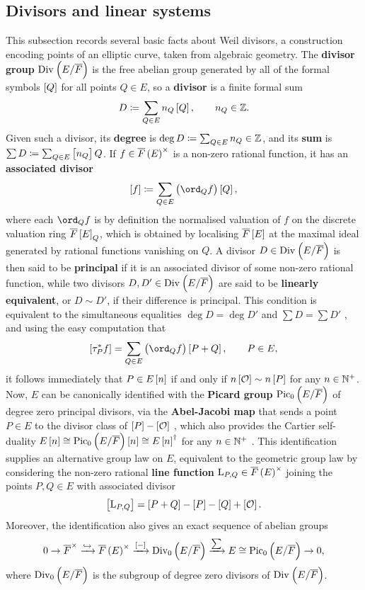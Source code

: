 \pagebreak

\subsection{Divisors and linear systems}

This subsection records several basic facts about Weil divisors, a construction encoding points of an elliptic curve, taken from algebraic geometry. The \textbf{divisor group} $ \Div $ is the free abelian group generated by all of the formal symbols $ \sbr{Q} $ for all points $ Q \in E $, so a \textbf{divisor} is a finite formal sum
$$ D \coloneqq \sum_{Q \in E} n_Q\sbr{Q}, \qquad n_Q \in \ZZ. $$
Given such a divisor, its \textbf{degree} is $ \deg D \coloneqq \sum_{Q \in E} n_Q \in \mathbb{Z} $, and its \textbf{sum} is $ \sum D \coloneqq \sum_{Q \in E} \sbr{n_Q}Q $. If $ f \in \overline{F}\br{E}^\times $ is a non-zero rational function, it has an \textbf{associated divisor}
$$ \sbr{f} \coloneqq \sum_{Q \in E} \br{\ord_Q f}\sbr{Q}, $$
where each $ \ord_Q f $ is by definition the normalised valuation of $ f $ on the discrete valuation ring $ \overline{F}\sbr{E}_Q $, which is obtained by localising $ \overline{F}\sbr{E} $ at the maximal ideal generated by rational functions vanishing on $ Q $. A divisor $ D \in \Div $ is then said to be \textbf{principal} if it is an associated divisor of some non-zero rational function, while two divisors $ D, D' \in \Div $ are said to be \textbf{linearly equivalent}, or $ D \sim D' $, if their difference is principal. This condition is equivalent to the simultaneous equalities $ \deg D = \deg D' $ and $ \sum D = \sum D' $ \cite[Corollary III.3.5]{Sil09}, and using the easy computation \cite[Proposition II.3.6(b)]{Sil09} that
$$ \sbr{\tau_P^*f} = \sum_{Q \in E} \br{\ord_Q f}\sbr{P + Q}, \qquad P \in E, $$
it follows immediately that $ P \in E\sbr{n} $ if and only if $ n\sbr{\OOO} \sim n\sbr{P} $ for any $ n \in \mathbb{N}^+ $. Now, $ E $ can be canonically identified with the \textbf{Picard group} $ \Pic $ of degree zero principal divisors, via the \textbf{Abel-Jacobi map} that sends a point $ P \in E $ to the divisor class of $ \sbr{P} - \sbr{\OOO} $ \cite[Proposition III.3.4]{Sil09}, which also provides the Cartier self-duality $ E\sbr{n} \cong \Pic\sbr{n} \cong E\sbr{n}^\dagger $ for any $ n \in \mathbb{N}^+ $ \cite[Theorem III.15.1]{Mum70}. This identification supplies an alternative group law on $ E $, equivalent to the geometric group law by considering the non-zero rational \textbf{line function} $ \L_{P, Q} \in \overline{F}\br{E}^\times $ joining the points $ P, Q \in E $ with associated divisor
$$ \sbr{\L_{P, Q}} = \sbr{P + Q} - \sbr{P} - \sbr{Q} + \sbr{\OOO}. $$
Moreover, the identification also gives an exact sequence of abelian groups \cite[Remark III.3.5.1]{Sil09}
$$ 0 \to \overline{F}^\times \xrightarrow{\hookrightarrow} \overline{F}\br{E}^\times \xrightarrow{\sbr{-}} \Div[0] \xrightarrow{\sum} E \cong \Pic \to 0, $$
where $ \Div[0] $ is the subgroup of degree zero divisors of $ \Div $.

